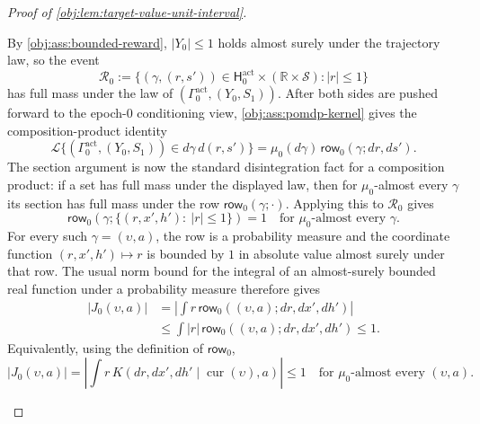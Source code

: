 \documentclass[11pt]{article}
\begin{document}
\begin{proof}[Proof of \cref{obj:lem:target-value-unit-interval}]
\begin{enumerate}
By \cref{obj:ass:bounded-reward}, \(|Y_0|\le1\) holds almost surely under the trajectory law, so the event
\[
\mathcal R_0
:=
\{(\gamma,(r,s'))\in\mathsf H^{\mathrm{act}}_0\times(\mathbb R\times\mathcal S): |r|\le1\}
\]
has full mass under the law of \((\Gamma^{\mathrm{act}}_0,(Y_0,S_1))\). After both sides are pushed forward to the epoch-\(0\) conditioning view, \cref{obj:ass:pomdp-kernel} gives the composition-product identity
\[
\mathcal L\{(\Gamma^{\mathrm{act}}_0,(Y_0,S_1))\in d\gamma\,d(r,s')\}
=
\mu_0(d\gamma)\,\mathsf{row}_0(\gamma;d r,d s').
\]
The section argument is now the standard disintegration fact for a composition product: if a set has full mass under the displayed law, then for \(\mu_0\)-almost every \(\gamma\) its section has full mass under the row \(\mathsf{row}_0(\gamma;\cdot)\). Applying this to \(\mathcal R_0\) gives
\[
\mathsf{row}_0\!\left(\gamma;\{(r,x',h'):\ |r|\le1\}\right)=1
\quad\text{for }\mu_0\text{-almost every }\gamma.
\]
For every such \(\gamma=(\upsilon,a)\), the row is a probability measure and the coordinate function \((r,x',h')\mapsto r\) is bounded by \(1\) in absolute value almost surely under that row. The usual norm bound for the integral of an almost-surely bounded real function under a probability measure therefore gives
\[
\begin{aligned}
|J_0(\upsilon,a)|
&=
\left|
\int r\,\mathsf{row}_0((\upsilon,a);d r,d x',d h')
\right| \\
&\le
\int |r|\,\mathsf{row}_0((\upsilon,a);d r,d x',d h')
\le 1 .
\end{aligned}
\]
Equivalently, using the definition of \(\mathsf{row}_0\),
\[
|J_0(\upsilon,a)|
=
\left|
\int r\,K(d r,d x',d h'\mid \operatorname{cur}(\upsilon),a)
\right|
\le1
\quad\text{for }\mu_0\text{-almost every }(\upsilon,a).
\]


\end{enumerate}
\end{proof}
\end{document}

